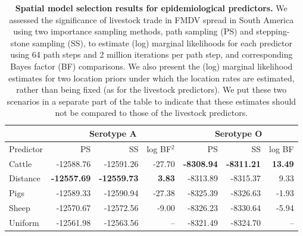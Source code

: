 \documentclass[10pt]{article}
\begin{document}
\newpage
\begin{table}[H]
\caption{
\textbf{Spatial model selection results for epidemiological predictors.}
We assessed the significance of livestock trade in FMDV spread in South America using two importance sampling methods,  path sampling (PS) and stepping-stone sampling (SS), to estimate (log) marginal likelihoods for each predictor using 64 path steps and 2 million iterations per path step, and corresponding Bayes factor (BF) comparisons.
We also present the (log) marginal likelihood estimates for two location priors under which the location rates are estimated, rather than being fixed (as for the livestock predictors).
We put these two scenarios in a separate part of the table to indicate that these estimates should not be compared to those of the livestock predictors.
}
\begin{center}
\begin{tabular}{lrrrrrr}
\toprule
 & \multicolumn{3}{c}{Serotype A}& \multicolumn{3}{c}{Serotype O}\\
 \midrule
Predictor & PS & SS & log BF$^2$ & PS & SS & log BF \\
Cattle&-12588.76&-12591.26&-27.70&\textbf{-8308.94}&\textbf{-8311.21}& \textbf{13.49}\\
Distance&\textbf{-12557.69}&\textbf{-12559.73}&\textbf{3.83}&-8313.89&-8315.37&9.33\\
Pigs&-12589.33&-12590.94&-27.38&-8325.39&-8326.63&-1.93\\
Sheep&-12570.67&-12572.56&-9.00&-8326.23&-8330.64&-5.94\\
Uniform&-12561.98&-12563.56&--&-8321.49&-8324.70&--\\
\bottomrule
\end{tabular}
\end{center}
\begin{flushleft}
\end{flushleft}
\label{tab:preds}
 \end{table}
\newpage
\end{document}
